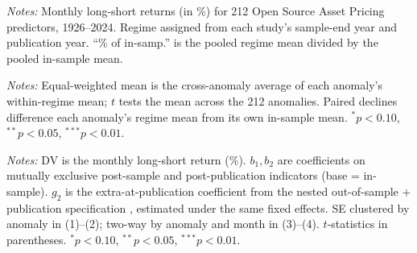 \documentclass[12pt]{article}
\begin{document}
\FloatBarrier
\newpage
\begin{table}[htbp]\centering
\begin{threeparttable}
\caption{Sample composition by publication regime}\label{tab:sumstats}\small

\begin{tablenotes}\small\item \textit{Notes:} Monthly long-short returns (in \%) for 212
Open Source Asset Pricing predictors, 1926--2024. Regime assigned from each study's
sample-end year and publication year. ``\% of in-samp.'' is the pooled regime mean divided by
the pooled in-sample mean.
\end{tablenotes}
\end{threeparttable}
\end{table}

\begin{table}[htbp]\centering
\begin{threeparttable}
\caption{Anomaly returns fall out of sample and again after publication}\label{tab:regime}\small

\begin{tablenotes}\small\item \textit{Notes:} Equal-weighted mean is the cross-anomaly average
of each anomaly's within-regime mean; $t$ tests the mean across the 212 anomalies. Paired
declines difference each anomaly's regime mean from its own in-sample mean.
$^{*}p<0.10$, $^{**}p<0.05$, $^{***}p<0.01$.
\end{tablenotes}
\end{threeparttable}
\end{table}

\begin{table}[htbp]\centering
\begin{threeparttable}
\caption{Panel regressions: post-sample and post-publication decay}\label{tab:panel}\small

\begin{tablenotes}\small\item \textit{Notes:} DV is the monthly long-short return (\%).
$b_1,b_2$ are coefficients on mutually exclusive post-sample and post-publication indicators
(base = in-sample). $g_2$ is the extra-at-publication coefficient from the nested
out-of-sample $+$ publication specification \citep{mcleanpontiff2016}, estimated under the
same fixed effects. SE clustered by anomaly in (1)--(2); two-way by anomaly and month in
(3)--(4). $t$-statistics in parentheses. $^{*}p<0.10$, $^{**}p<0.05$, $^{***}p<0.01$.
\end{tablenotes}
\end{threeparttable}
\end{table}
\end{document}
